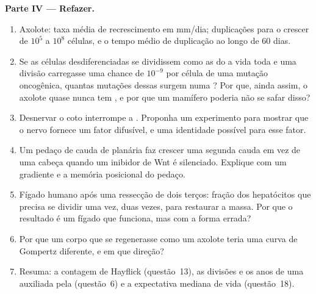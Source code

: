 \begin{problem}
\medskip
\noindent\textbf{Parte IV --- Refazer.}
\begin{enumerate}[resume]
  \item Axolote: taxa média de recrescimento em mm/dia; duplicações para
        o  crescer de $10^{5}$ a $10^{8}$ células, e o tempo
        médio de duplicação ao longo de 60 dias.
  \item Se as células desdiferenciadas se dividissem como as do 
        a vida toda e uma divisão carregasse uma chance de $10^{-9}$ por
        célula de uma mutação oncogênica, quantas mutações dessas surgem
        numa ? Por que, ainda assim, o axolote quase nunca tem
        , e por que um mamífero poderia não se safar disso?
  \item Desnervar o coto interrompe a . Proponha um
        experimento para mostrar que o nervo fornece um fator difusível,
        e uma identidade possível para esse fator.
  \item Um pedaço de cauda de planária faz crescer uma segunda cauda em
        vez de uma cabeça quando um inibidor de Wnt é silenciado.
        Explique com um gradiente e a memória posicional do pedaço.
  \item Fígado humano após uma ressecção de dois terços: fração dos
        hepatócitos que precisa se dividir uma vez, duas vezes, para
        restaurar a massa. Por que o resultado é um fígado que funciona,
        mas com a forma errada?
  \item Por que um corpo que se regenerasse como um axolote teria uma
        curva de Gompertz diferente, e em que direção?
  \item Resuma: a contagem de Hayflick (questão~13), as divisões e os
        anos de uma  auxiliada pela  (questão~6) e
        a expectativa mediana de vida (questão~18).
\end{enumerate}
\end{problem}
